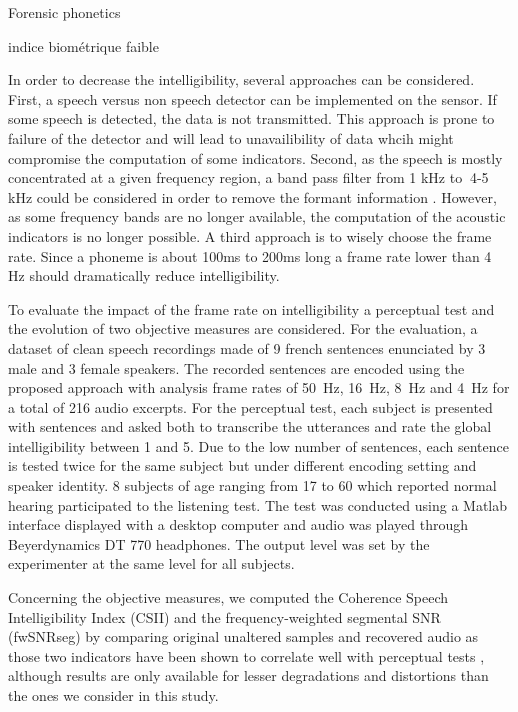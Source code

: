 \documentclass[final,3p,times,twocolumn]{elsarticle}
\begin{document}
Forensic phonetics \cite{baldwin1990forensic}

indice biométrique faible \cite{boe2000forensic}

In order to decrease the intelligibility, several approaches can be considered. First,  a speech versus non speech detector can be implemented on the sensor. If some speech is detected, the data is not transmitted. This approach is prone to failure of the detector and will lead to unavailibility of data whcih might compromise the computation of some indicators. Second, as the speech is mostly concentrated at a given frequency region, a band pass filter from 1 kHz to $~$4-5 kHz could be considered in order to remove the formant information \cite{kent1992acoustic}. However, as some frequency bands are no longer available, the computation of the acoustic indicators is no longer possible. A third approach is to wisely choose the frame rate. Since a phoneme is about 100ms to 200ms long \cite{kuwabara1996acoustic} \cite{rosen1992temporal} a frame rate lower than 4 Hz should dramatically reduce intelligibility.





To evaluate the impact of the frame rate on intelligibility a perceptual test and the evolution of two objective measures are considered. For the evaluation, a dataset of clean speech recordings made of 9 french sentences enunciated by 3 male and 3 female speakers. The recorded sentences are encoded using the proposed approach with analysis frame rates of 50~Hz, 16~Hz, 8~Hz and 4~Hz for a total of 216 audio excerpts. For the perceptual test, each subject is presented with sentences and asked both to transcribe the utterances and rate the global intelligibility between 1 and 5. Due to the low number of sentences, each sentence is tested twice for the same subject but under different encoding setting and speaker identity. 8 subjects of age ranging from 17 to 60 which reported normal hearing  participated to the listening test. The test was conducted using a Matlab interface displayed with a desktop computer and audio was played through Beyerdynamics DT 770 headphones. The output level was set by the experimenter at the same level for all subjects.


Concerning the objective measures, we computed the Coherence Speech Intelligibility Index \cite{kates2005} (CSII) and the frequency-weighted segmental SNR \cite{hu2008} (fwSNRseg) by comparing original unaltered samples and recovered audio as those two indicators have been shown to correlate well with perceptual tests \cite{ma2009}, although results are only available for lesser degradations and distortions than the ones we consider in this study. \\
\end{document}
